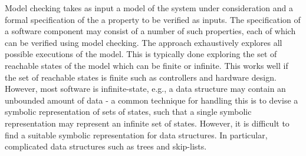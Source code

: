 Model checking takes as input a model of the system under
consideration and a formal specification of the a property to be verified as inputs. The specification of a software component may consist of a number of such properties, each of which can be verified using model checking. The approach exhaustively explores all possible executions of the model. This is typically done exploring the set of reachable states of the model  which can be finite or infinite. 
This works well if the set of reachable states is finite such as controllers and hardware design.  However, most software is infinite-state, e.g., a data structure may contain an unbounded amount of data - a common technique for handling this is to devise a symbolic representation of sets of states, such that a single symbolic representation may represent an infinite set of states. However, it is difficult to find a suitable symbolic representation for data structures. In particular, complicated data structures such as trees and skip-lists.

